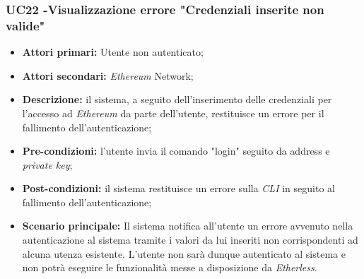 \subsubsection{UC22 -Visualizzazione errore "Credenziali inserite non valide"}
\begin{itemize}
	\item \textbf{Attori primari:} Utente non autenticato;
    \item \textbf{Attori secondari:} \textit{Ethereum\glo} Network;
	\item \textbf{Descrizione:} il sistema, a seguito dell'inserimento delle credenziali per l'accesso ad \textit{Ethereum\glo} da parte dell'utente, restituisce un errore per il fallimento dell'autenticazione;
	\item \textbf{Pre-condizioni:} l'utente invia il comando "login" seguito da address e \textit{private key\glos};
	\item \textbf{Post-condizioni:} il sistema restituisce un errore sulla \textit{CLI\glo} in seguito al fallimento dell'autenticazione;
	\item \textbf{Scenario principale:} Il sistema notifica all'utente un errore avvenuto nella autenticazione al sistema tramite i valori da lui inseriti non corrispondenti ad alcuna utenza esistente. L'utente non sarà dunque autenticato al sistema e non potrà eseguire le funzionalità messe a disposizione da \textit{Etherless}.
\end{itemize}